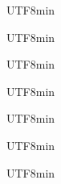 \documentclass{article}
\begin{document}
\pagestyle{empty}

\Huge
\begin{center}
\vfill
\begin{CJK}{UTF8}{min}
\scalebox{4}{侍} %
\end{CJK}
\vfill
\begin{CJK}{UTF8}{min}
\scalebox{4}{柔道} %
\end{CJK}
\vfill
\begin{CJK}{UTF8}{min}
\scalebox{4}{合気道} %
\end{CJK}
\vfill
\begin{CJK}{UTF8}{min}
\scalebox{4}{勇気} %
\end{CJK}
\vfill
\begin{CJK}{UTF8}{min}
\scalebox{4}{謙虚} %
\end{CJK}
\vfill
\begin{CJK}{UTF8}{min}
\scalebox{4}{整合性} %
\end{CJK}
\vfill
\begin{CJK}{UTF8}{min}
\scalebox{4}{慈悲} %
\end{CJK}
\vfill
\end{center}
\end{document}
